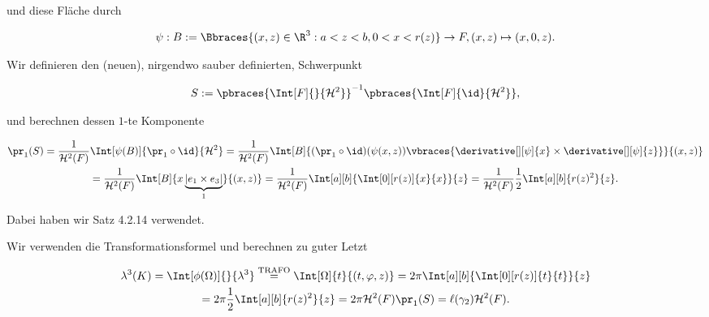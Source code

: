 \begin{solution}
\begin{enumerate}[label = \arabic*.]
    und diese Fläche durch

    \begin{align*}
        \psi:
            B := \Bbraces{(x, z) \in \R^3: a < z < b, 0 < x < r(z)} \to F,
            (x, z) \mapsto (x, 0, z).
    \end{align*}

    Wir definieren den (neuen), nirgendwo sauber definierten, Schwerpunkt

    \begin{align*}
        S
        :=
        \pbraces
        {
            \Int[F]{}{\mathcal H^2}
        }^{-1}
        \pbraces
        {
            \Int[F]{\id}{\mathcal H^2}
        },
    \end{align*}

    und berechnen dessen $1$-te Komponente

    \begin{multline*}
        \pr_1(S)
        =
        \frac{1}{\mathcal H^2(F)}
        \Int[\psi(B)]
        {
            \pr_1 \circ \id
        }{\mathcal H^2}
        =
        \frac{1}{\mathcal H^2(F)}
        \Int[B]
        {
            (\pr_1 \circ \id)(\psi(x, z))
            \vbraces
            {
                \derivative[][\psi]{x}
                \times
                \derivative[][\psi]{z}
            }
        }{(x, z)} \\
        =
        \frac{1}{\mathcal H^2(F)}
        \Int[B]
        {
            x
            \underbrace{|e_1 \times e_3|}_1
        }{(x, z)}
        =
        \frac{1}{\mathcal H^2(F)}
        \Int[a][b]
        {
            \Int[0][r(z)]
            {
                x
            }{x}
        }{z}
        =
        \frac{1}{\mathcal H^2(F)}
        \frac{1}{2}
        \Int[a][b]
        {
            r(z)^2
        }{z}.
    \end{multline*}

    Dabei haben wir Satz 4.2.14 verwendet.


    Wir verwenden die Transformationsformel und berechnen zu guter Letzt

    \begin{multline*}
        \lambda^3(K)
        =
        \Int[\phi(\Omega)]{}{\lambda^3}
        \stackrel
        {
            \text{TRAFO}
        }{=}
        \Int[\Omega]{t}{(t, \varphi, z)}
        =
        2 \pi
        \Int[a][b]
        {
            \Int[0][r(z)]
            {
                t
            }{t}
        }{z} \\
        =
        2 \pi
        \frac{1}{2}
        \Int[a][b]
        {
            r(z)^2
        }{z}
        =
        2 \pi
        \mathcal H^2(F) \pr_1(S)
        =
        \ell(\gamma_2) \mathcal H^2(F).
    \end{multline*}

\end{enumerate}

\end{solution}

